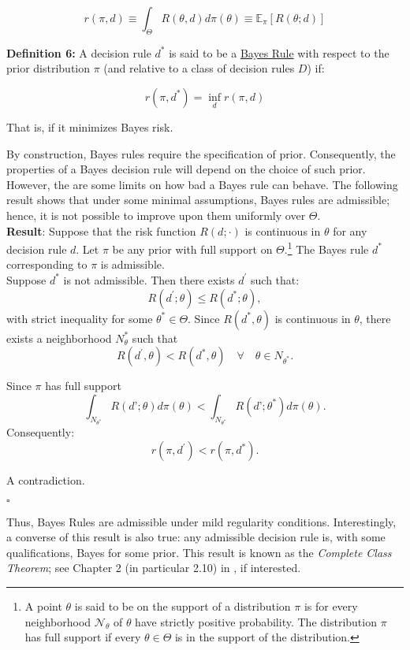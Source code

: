 \documentclass[11pt]{article} %
\begin{document}
\[ r(\pi, d) \equiv \int_{\Theta} R(\theta, d) d \pi (\theta) \equiv \mathbb{E}_{\pi} [ R(\theta; d) ] \]

\noindent \textbf{Definition 6:} A decision rule $d^*$ is said to be a \underline{Bayes Rule} with respect to the prior distribution $\pi$ (and relative to a class of decision rules $D$) if:

\[ r(\pi, d^*) = \inf_{d} r(\pi, d)   \]

\noindent That is, if it minimizes Bayes risk. 

By construction, Bayes rules require the specification of prior. Consequently, the properties of a Bayes decision rule will depend on the choice of such prior. However, the are some limits on how bad a Bayes rule can behave. The following result shows that under some minimal assumptions, Bayes rules are admissible; hence, it is not possible to improve upon them uniformly over $\Theta$. \\


\noindent \textbf{Result}: Suppose that the risk function $R(d; \cdot)$ is continuous in $\theta$ for any decision rule $d$. Let $\pi$ be any prior with full support on $\Theta$.\footnote{A point $\theta$ is said to be on the support of a distribution $\pi$ is for every neighborhood $\mathcal{N}_{\theta}$ of $\theta$ have strictly positive probability. The distribution $\pi$ has full support if every $\theta \in \Theta$ is in the support of the distribution.} The Bayes rule $d^*$ corresponding to $\pi$ is admissible. \\

 Suppose $d^*$ is not admissible. Then there exists $d^{\prime}$ such that:
\[ R(d^{\prime}; \theta) \leq R(d^*; \theta),  \]
with strict inequality for some $\theta^* \in \Theta$. Since $R(d^*,\theta)$ is continuous in $\theta$, there exists a neighborhood $N_\theta^*$ such that 
\[  R(d^{\prime}, \theta) < R(d^*, \theta) \quad \forall \quad \theta \in N_{\theta^*}. \]

\noindent Since $\pi$ has full support 
\[ \int_{N_{\theta^*}} R(d’;\theta) d \pi(\theta) < \int_{N_{\theta^*}} R(d’;\theta^*) d \pi(\theta).   \]
Consequently:
\[ r(\pi, d^{\prime}) < r(\pi, d^*).   \]

\noindent A contradiction. \\

\begin{flushright}
$\square$
\end{flushright}

\noindent Thus, Bayes Rules are admissible under mild regularity conditions. Interestingly, a converse of this result is also true: any admissible decision rule is, with some qualifications,	 Bayes for some prior. This result is known as the \emph{Complete Class Theorem}; see Chapter 2 (in particular 2.10) in \cite{Ferguson67}, if interested.  
\end{document}
